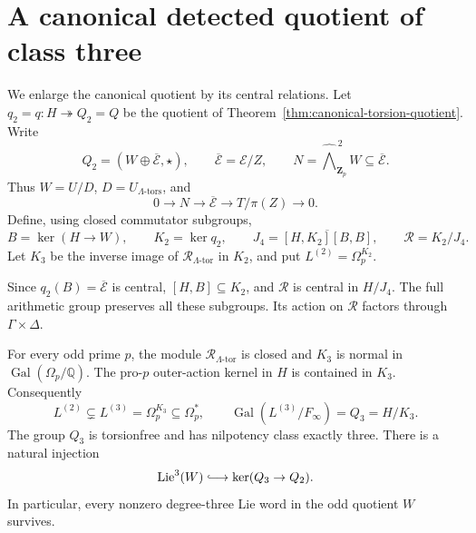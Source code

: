 \section{A canonical detected quotient of class three}
\label{sec:canonical-class-three}

We enlarge the canonical quotient by its central relations.
Let \(q_2=q:H\twoheadrightarrow Q_2=Q\) be the quotient of
Theorem~\ref{thm:canonical-torsion-quotient}. Write
\[
 Q_2=(W\oplus\overline{\mathcal E},\star),\qquad
 \overline{\mathcal E}=\mathcal E/Z,\qquad
 N=\widehat{\bigwedge}^{\,2}_{\mathbf Z_p}W\subseteq\overline{\mathcal E}.
\]
Thus \(W=U/D\), \(D=U_{\Lambda\text{-tors}}\), and
\[
 0\longrightarrow N\longrightarrow\overline{\mathcal E}
 \longrightarrow T/\pi(Z)\longrightarrow0.
\]
Define, using closed commutator subgroups,
\[
 B=\ker(H\to W),\qquad K_2=\ker q_2,\qquad
 J_4=\overline{[H,K_2][B,B]},\qquad
 \mathcal R=K_2/J_4.
\]
Let \(K_3\) be the inverse image of \(\mathcal R_{\Lambda\text{-tor}}\) in \(K_2\), and put \(L^{(2)}=\Omega_p^{K_2}\).

Since \(q_2(B)=\overline{\mathcal E}\) is central,
\([H,B]\subseteq K_2\), and \(\mathcal R\) is central in \(H/J_4\).
The full arithmetic group preserves all these subgroups.
Its action on \(\mathcal R\) factors through \(\Gamma\times\Delta\).

\begin{theorem}
\label{thm:canonical-class-three}
For every odd prime $p$, the module
$\mathcal R_{\Lambda\text{-tor}}$ is closed and $K_3$ is
normal in $\operatorname{Gal}(\Omega_p/\mathbb Q)$.
The pro-$p$ outer-action kernel in $H$ is contained in $K_3$.
Consequently
\[
 L^{(2)}\subsetneq L^{(3)}=\Omega_p^{K_3}\subseteq\Omega_p^*,
 \qquad \operatorname{Gal}(L^{(3)}/F_\infty)=Q_3=H/K_3.
\]
The group $Q_3$ is torsionfree and has nilpotency class exactly three.
There is a natural injection
\[
 \operatorname{Lie}^3(W)\lhook\joinrel\longrightarrow
                         \ker(Q_3\to Q_2).
\]
In particular, every nonzero degree-three Lie word in the odd
quotient $W$ survives.
\end{theorem}

